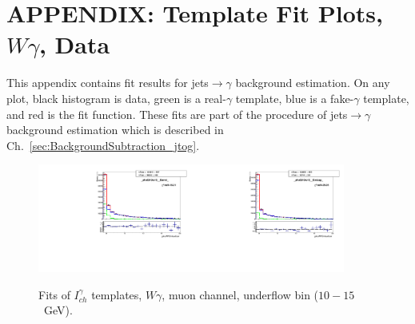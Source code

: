 \chapter{APPENDIX: Template Fit Plots, $W\gamma$, Data}
\label{sec:TemplateFitPlots}

This appendix contains fit results for jets$\rightarrow \gamma$ background estimation. On any plot, black histogram is data, green is a real-$\gamma$ template, blue is a fake-$\gamma$ template, and red is the fit function. These fits are part of the procedure of jets$\rightarrow\gamma$ background estimation which is described in Ch.~\ref{sec:BackgroundSubtraction_jtog}.


  

\begin{figure}[htb]
  \begin{center}
   \includegraphics[width=0.45\textwidth]{../figs/figs_v11/MUON_WGamma/TemplateFits/c_TEMPL_CHISO_UNblind__phoEt10to15__Barrel__RooFit.pdf}\includegraphics[width=0.45\textwidth]{../figs/figs_v11/MUON_WGamma/TemplateFits/c_TEMPL_CHISO_UNblind__phoEt10to15__Endcap__RooFit.pdf}\\
  \label{fig:templateFits_CHISO_MUON_0}
  \caption{Fits of $I_{ch}^{\gamma}$ templates, $W\gamma$, muon channel, underflow bin ($10-15$~GeV).}
  \end{center}
\end{figure}

